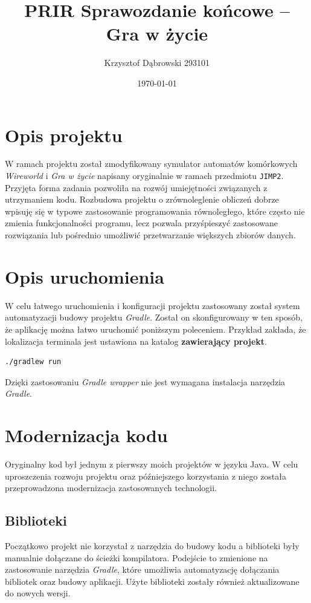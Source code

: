 \documentclass{mwart}
\title{PRIR Sprawozdanie końcowe -- Gra w życie}
\author{Krzysztof Dąbrowski 293101}
\date{\today}
\begin{document}
\maketitle{}

\tableofcontents{}

\pagebreak{}

\section{Opis projektu}
W ramach projektu został zmodyfikowany symulator automatów komórkowych \textit{Wireworld} i \textit{Gra w życie} napisany oryginalnie w ramach przedmiotu \texttt{JIMP2}. Przyjęta forma zadania pozwoliła na rozwój umiejętności związanych z utrzymaniem kodu. Rozbudowa projektu o zrównoleglenie obliczeń dobrze wpisuję się w typowe zastosowanie programowania równoległego, które często nie zmienia funkcjonalności programu, lecz pozwala przyśpieszyć zastosowane rozwiązania lub pośrednio umożliwić przetwarzanie większych zbiorów danych.

\section{Opis uruchomienia}
W celu łatwego uruchomienia i konfiguracji projektu zastosowany został system automatyzacji budowy projektu \textit{Gradle}. Został on skonfigurowany w ten sposób, że aplikację można łatwo uruchomić poniższym poleceniem. Przykład zakłada, że lokalizacja terminala jest ustawiona na katalog \textbf{zawierający projekt}.

\begin{lstlisting}[language=bash]
./gradlew run 
\end{lstlisting}

Dzięki zastosowaniu \textit{Gradle wrapper} nie jest wymagana instalacja narzędzia \textit{Gradle}.

\section{Modernizacja kodu}
Oryginalny kod był jednym z pierwszy moich projektów w języku Java. W celu uproszczenia rozwoju projektu oraz późniejszego korzystania z niego została przeprowadzona modernizacja zastosowanych technologii.

\subsection*{Biblioteki}
Początkowo projekt nie korzystał z narzędzia do budowy kodu a biblioteki były manualnie dołączane do ścieżki kompilatora. Podejście to zmienione na zastosowanie narzędzia \textit{Gradle}, które umożliwia automatyzację dołączania bibliotek oraz budowy aplikacji. Użyte biblioteki zostały również aktualizowane do nowych wersji.
\end{document}
